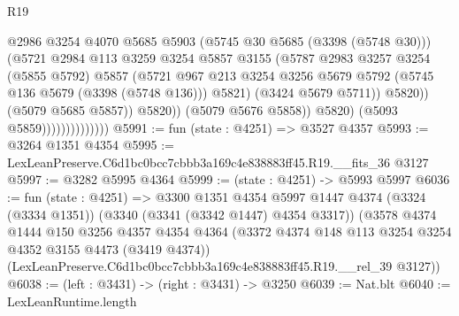 \begin{lexlean}{R19}
\begin{coremodule}
                                          @2986
                                          @3254
                                          @4070
                                          @5685
                                          @5903
                                          (@5745 @30 @5685 (@3398 (@5748 @30)))
                                          (@5721
                                            @2984
                                            @113
                                            @3259
                                            @3254
                                            @5857
                                            @3155
                                            (@5787
                                              @2983
                                              @3257
                                              @3254
                                              (@5855 @5792)
                                              @5857
                                              (@5721
                                                @967
                                                @213
                                                @3254
                                                @3256
                                                @5679
                                                @5792
                                                (@5745 @136 @5679 (@3398 (@5748 @136)))
                                                @5821)
                                              (@3424 @5679 @5711))
                                            @5820))
                                        (@5079 @5685 @5857))
                                      @5820))
                                  (@5079 @5676 @5858))
                                @5820)
                              (@5093 @5859))))))))))))))
@5991 := fun (state : @4251) => @3527 @4357
@5993 := @3264 @1351 @4354
@5995 := LexLeanPreserve.C6d1bc0bcc7cbbb3a169c4e838883ff45.R19.__fits_36 @3127
@5997 := @3282 @5995 @4364
@5999 := (state : @4251) -> @5993 @5997
@6036 := fun (state : @4251) =>
  @3300
    @1351
    @4354
    @5997
    @1447
    @4374
    (@3324 (@3334 @1351))
    (@3340 (@3341 (@3342 @1447) @4354 @3317))
    (@3578
      @4374
      @1444
      @150
      @3256
      @4357
      @4354
      @4364
      (@3372 @4374 @148 @113 @3254 @3254 @4352 @3155 @4473 (@3419 @4374))
      (LexLeanPreserve.C6d1bc0bcc7cbbb3a169c4e838883ff45.R19.__rel_39 @3127))
@6038 := (left : @3431) -> (right : @3431) -> @3250
@6039 := Nat.blt
@6040 := LexLeanRuntime.length

\end{coremodule}
\end{lexlean}
